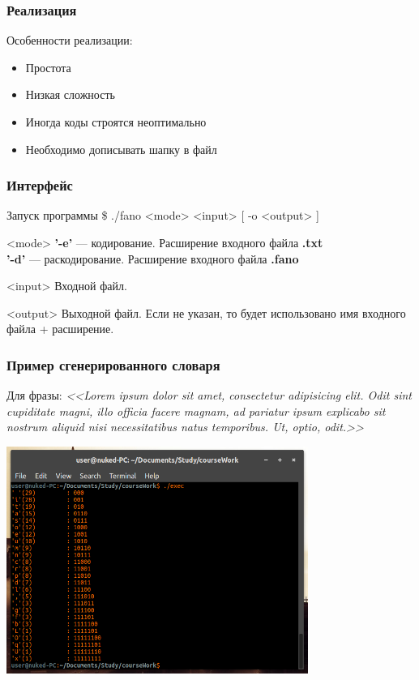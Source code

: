 \documentclass[10pt,pdf,hyperref={unicode}]{beamer}
\begin{document}
\begin{frame}
	\frametitle{Реализация}
	Особенности реализации:
	\begin{itemize}
		\item Простота
		\item Низкая сложность
		\item Иногда коды строятся неоптимально
		\item Необходимо дописывать шапку в файл
	\end{itemize}
\end{frame}

\begin{frame}
	\frametitle{Интерфейс}
	\begin{block}{Запуск программы}
		\$ ./fano <mode> <input> [ -o <output> ]
	\end{block}
	\begin{exampleblock}{<mode>}
		\textbf{'-e'} --- кодирование. Расширение входного файла \textbf{.txt}\\
		\textbf{'-d'} --- раскодирование. Расширение входного файла \textbf{.fano}
	\end{exampleblock}
	\begin{exampleblock}{<input>}
		Входной файл.
	\end{exampleblock}
	\begin{exampleblock}{<output>}
		Выходной файл. Если не указан, то будет 
		использовано имя входного файла + расширение.
	\end{exampleblock}
\end{frame}

\begin{frame}
	\frametitle{Пример сгенерированного словаря}
	Для фразы:
	\newline\newline
	\scriptsize{\textit{<<Lorem ipsum dolor sit amet, consectetur adipisicing elit. Odit sint cupiditate magni, illo officia facere magnam, ad pariatur ipsum explicabo sit nostrum aliquid nisi necessitatibus natus temporibus. Ut, optio, odit.>>}}
	\newline\newline
	\centerline{\includegraphics[height=20em]{gen.png}}
\end{frame}
\end{document}
